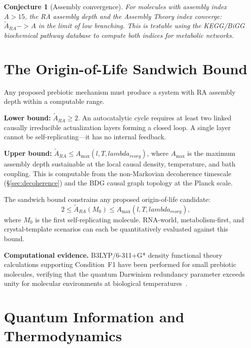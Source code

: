 \documentclass[11pt]{article}
\def\ell{l}%
\def\lambda{lambda}%
\def\mathrm#1{#1}%
\def\to{->}%
\newtheorem{conjecture}{Conjecture}
\begin{document}
\begin{conjecture}[Assembly convergence]
For molecules with assembly index $A>15$, the RA assembly depth and the Assembly Theory index converge: $\tilde{A}_{\mathrm{RA}}\to A$ in the limit of low branching. This is testable using the KEGG/BiGG biochemical pathway database to compute both indices for metabolic networks.
\end{conjecture}

\section{The Origin-of-Life Sandwich Bound}
\label{sec:sandwich}

Any proposed prebiotic mechanism must produce a system with RA assembly depth within a computable range.

\textbf{Lower bound:} $\tilde{A}_{\mathrm{RA}}\ge 2$. An autocatalytic cycle requires at least two linked causally irreducible actualization layers forming a closed loop. A single layer cannot be self-replicating---it has no internal feedback.

\textbf{Upper bound:} $\tilde{A}_{\mathrm{RA}}\le A_{\max}(\ell, T, \lambda_{\mathrm{reorg}})$, where $A_{\max}$ is the maximum assembly depth sustainable at the local causal density, temperature, and bath coupling. This is computable from the non-Markovian decoherence timescale (\S\ref{sec:decoherence}) and the BDG causal graph topology at the Planck scale.

The sandwich bound constrains any proposed origin-of-life candidate:
\begin{equation}
2 \le \tilde{A}_{\mathrm{RA}}(M_0) \le A_{\max}(\ell, T, \lambda_{\mathrm{reorg}}),
\end{equation}
where $M_0$ is the first self-replicating molecule. RNA-world, metabolism-first, and crystal-template scenarios can each be quantitatively evaluated against this bound.

\textbf{Computational evidence.} B3LYP/6-311+G* density functional theory calculations supporting Condition~F1 have been performed for small prebiotic molecules, verifying that the quantum Darwinism redundancy parameter exceeds unity for molecular environments at biological temperatures~\cite{Sandeman2026RACI}.

\section{Quantum Information and Thermodynamics}
\label{sec:qinfo}
\end{document}
